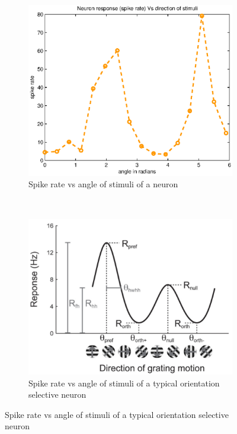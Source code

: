 \documentclass[11pt]{article}
\newcommand{\rulesep}{\unskip\ \vrule\ }
\begin{document}
\begin{figure}
\centering
\caption{Comparing response of a neuron Vs angle of stimuli with the expected response}
\label{angle_resp}
\begin{subfigure}{.48\textwidth}
    \centering
    \includegraphics[width=\linewidth]{plots/max_osi}
    \caption{Spike rate vs angle of stimuli of a neuron}
\end{subfigure}
\rulesep
\begin{subfigure}{.48\textwidth}
    \centering
    \includegraphics[width=\linewidth]{plots/typical_response.png}
    \caption{Spike rate vs angle of stimuli of a typical orientation selective neuron}
\end{subfigure}
\end{figure}
\end{document}
